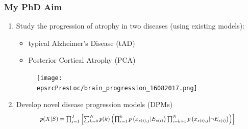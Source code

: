 \documentclass[8pt,xcolor=table]{beamer}
\begin{document}
\newcommand{\titleHigh}[1]{{\transparent{1.0}\textbf{#1}}} %
\newcommand{\titleHighTwo}[1]{\underline{\textbf{#1}}} %
\newcommand{\transpLevel}{0.4}

% 
% 
% 



\begin{frame}
\frametitle{My PhD Aim}

\begin{enumerate}
 \item Study the progression of atrophy in two diseases (using existing models): 
 \begin{itemize}
  \item typical Alzheimer's Disease (tAD)
  \item Posterior Cortical Atrophy (PCA)
 \end{itemize}
 
  \begin{figure}
  \centering
  \vspace{1em}
  \texttt{[image: \\epsrcPresLoc/brain\_progression\_16082017.png]}
  \end{figure}
 
 \vspace{1em}

 \item Develop novel disease progression models (DPMs)
  \begin{equation}
  \resizebox{0.8\columnwidth}{!}{%
  $p(X|S) = \prod_{j=1}^J \left[ \sum_{k=0}^N p(k) \left( \prod_{i=1}^k p\left(x_{s(i),j} | E_{s(i)} \right) \prod_{i=k+1}^N p\left(x_{s(i),j} | \neg E_{s(i)}\right) \right) \right]$
  }
  \end{equation}


\end{enumerate}

\end{frame}
\end{document}
